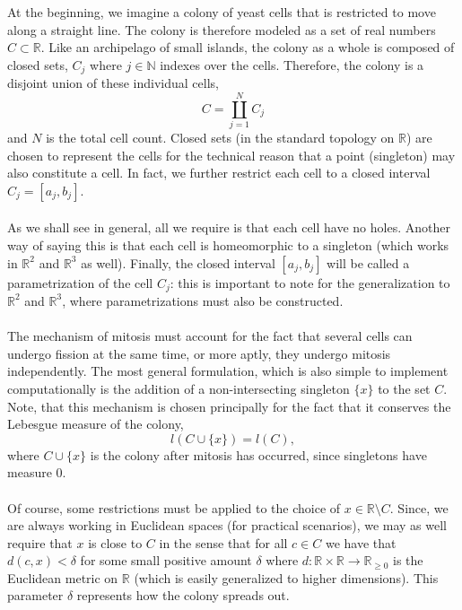 At the beginning, we imagine a colony of yeast cells that is restricted to move along a straight line. The colony is therefore modeled as a set of real numbers $C \subset \mathbb{R}$. Like an archipelago of small islands, the colony as a whole is composed of closed sets, $C_j$ where $j \in \mathbb{N}$ indexes over the cells. Therefore, the colony is a disjoint union of these individual cells,
\begin{equation*}
    C = \coprod_{j=1}^N C_j
\end{equation*}
and $N$ is the total cell count. Closed sets (in the standard topology on $\mathbb{R}$) are chosen to represent the cells for the technical reason that a point (singleton) may also constitute a cell. In fact, we further restrict each cell to a closed interval $C_j = [a_j, b_j]$.
\\
\\
As we shall see in general, all we require is that each cell have no holes. Another way of saying this is that each cell is homeomorphic to a singleton (which works in $\mathbb{R}^2$ and $\mathbb{R}^3$ as well). Finally, the closed interval $[a_j,b_j]$ will be called a parametrization of the cell $C_j$: this is important to note for the generalization to $\mathbb{R}^2$ and $\mathbb{R}^3$, where parametrizations must also be constructed.
\\
\\
The mechanism of mitosis must account for the fact that several cells can undergo fission at the same time, or more aptly, they undergo mitosis independently. The most general formulation, which is also simple to implement computationally is the addition of a non-intersecting singleton $\{x  \}$ to the set $C$. Note, that this mechanism is chosen principally for the fact that it conserves the Lebesgue measure of the colony,
\begin{equation*}
    l(C \cup \{x\} ) = l(C),
\end{equation*}
where $C \cup \{x\} $ is the colony after mitosis has occurred, since singletons have measure $0$. 
\\
\\
Of course, some restrictions must be applied to the choice of $x \in \mathbb{R} \setminus C$. Since, we are always working in Euclidean spaces (for practical scenarios), we may as well require that $x$ is close to $C$ in the sense that for all $c \in C$ we have that $d(c,x) < \delta$ for some small positive amount $\delta$ where $d: \mathbb{R} \times \mathbb{R} \rightarrow \mathbb{R}_{\geq 0}$ is the Euclidean metric on $\mathbb{R}$ (which is easily generalized to higher dimensions). This parameter $\delta$ represents how the colony spreads out.
